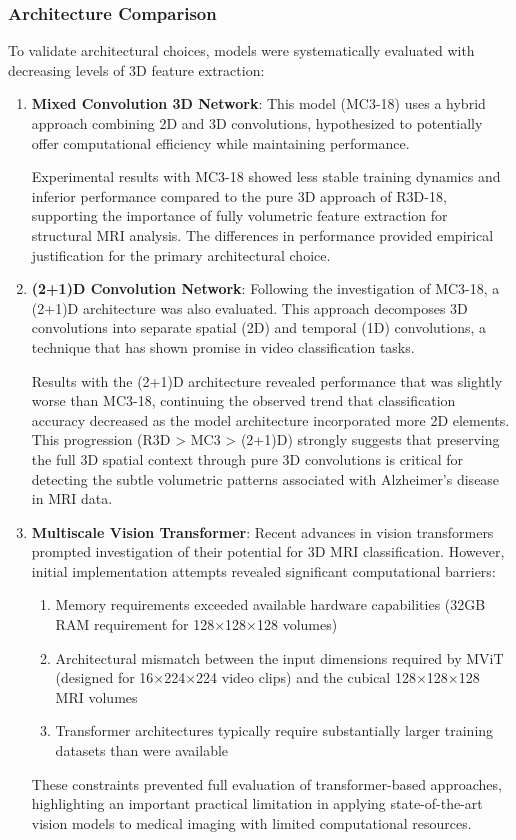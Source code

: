 \documentclass[12pt, a4paper]{article}
\begin{document}
\subsubsection{Architecture Comparison}

To validate architectural choices, models were systematically evaluated with decreasing levels of 3D feature extraction:

\begin{enumerate}
    \item \textbf{Mixed Convolution 3D Network}: This model (MC3-18) uses a hybrid approach combining 2D and 3D convolutions, hypothesized to potentially offer computational efficiency while maintaining performance.
      
      Experimental results with MC3-18 showed less stable training dynamics and inferior performance compared to the pure 3D approach of R3D-18, supporting the importance of fully volumetric feature extraction for structural MRI analysis. The differences in performance provided empirical justification for the primary architectural choice.

    \item \textbf{(2+1)D Convolution Network}: Following the investigation of MC3-18, a (2+1)D architecture was also evaluated. This approach decomposes 3D convolutions into separate spatial (2D) and temporal (1D) convolutions, a technique that has shown promise in video classification tasks.
      
      Results with the (2+1)D architecture revealed performance that was slightly worse than MC3-18, continuing the observed trend that classification accuracy decreased as the model architecture incorporated more 2D elements. This progression (R3D > MC3 > (2+1)D) strongly suggests that preserving the full 3D spatial context through pure 3D convolutions is critical for detecting the subtle volumetric patterns associated with Alzheimer's disease in MRI data.
      
    \item \textbf{Multiscale Vision Transformer}: Recent advances in vision transformers prompted investigation of their potential for 3D MRI classification. However, initial implementation attempts revealed significant computational barriers:
      
      \begin{enumerate}
        \item Memory requirements exceeded available hardware capabilities (32GB RAM requirement for 128×128×128 volumes)
        \item Architectural mismatch between the input dimensions required by MViT (designed for 16×224×224 video clips) and the cubical 128×128×128 MRI volumes
        \item Transformer architectures typically require substantially larger training datasets than were available
      \end{enumerate}
      
      These constraints prevented full evaluation of transformer-based approaches, highlighting an important practical limitation in applying state-of-the-art vision models to medical imaging with limited computational resources.
\end{enumerate}
\end{document}
